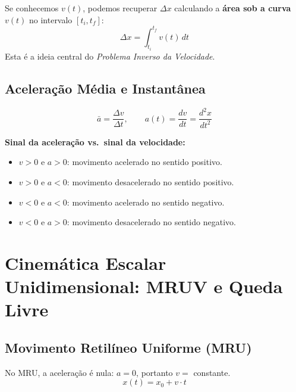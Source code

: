\documentclass[10.5pt, a4paper]{extarticle}
\begin{document}
\begin{squirtlebox}
Se conhecemos $v(t)$, podemos recuperar $\Delta x$ calculando a \textbf{área sob a curva} $v(t)$ no intervalo $[t_i, t_f]$:
\[
  \Delta x = \int_{t_i}^{t_f} v(t)\,dt
\]
Esta é a ideia central do \textit{Problema Inverso da Velocidade}.
\end{squirtlebox}

\subsection{Aceleração Média e Instantânea}

\begin{definicaobox}
\[
  \bar{a} = \frac{\Delta v}{\Delta t}, \qquad
  a(t) = \frac{dv}{dt} = \frac{d^2x}{dt^2}
\]
\end{definicaobox}

\begin{pikabox}
\textbf{Sinal da aceleração vs.\ sinal da velocidade:}
\begin{itemize}[nosep]
  \item $v > 0$ e $a > 0$: movimento acelerado no sentido positivo.
  \item $v > 0$ e $a < 0$: movimento desacelerado no sentido positivo.
  \item $v < 0$ e $a < 0$: movimento acelerado no sentido negativo.
  \item $v < 0$ e $a > 0$: movimento desacelerado no sentido negativo.
\end{itemize}
\end{pikabox}

\section{Cinemática Escalar Unidimensional: MRUV e Queda Livre}

\subsection{Movimento Retilíneo Uniforme (MRU)}

\begin{definicaobox}
No MRU, a aceleração é nula: $a = 0$, portanto $v = $ constante.
\[
  \boxed{x(t) = x_0 + v \cdot t}
\]
\end{definicaobox}
\end{document}
